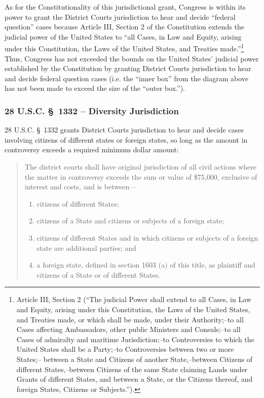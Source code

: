 As for the Constitutionality of this jurisdictional grant, Congress is within its power to grant the District Courts jurisdiction to hear and decide ``federal question'' cases because Article III, Section 2 of the Constitution extends the judicial power of the United States to ``all Cases, in Law and Equity, arising under this Constitution, the Laws of the United States, and Treaties made.''\footnote{Article III, Section 2 (``The judicial Power shall extend to all Cases, in Law and Equity, arising under this Constitution, the Laws of the United States, and Treaties made, or which shall be made, under their Authority;--to all Cases affecting Ambassadors, other public Ministers and Consuls;--to all Cases of admiralty and maritime Jurisdiction;--to Controversies to which the United States shall be a Party;--to Controversies between two or more States;-- between a State and Citizens of another State,--between Citizens of different States,--between Citizens of the same State claiming Lands under Grants of different States, and between a State, or the Citizens thereof, and foreign States, Citizens or Subjects.'').}  Thus, Congress has not exceeded the bounds on the United States' judicial power established by the Constitution by granting District Courts jurisdiction to hear and decide federal question cases (i.e. the ``inner box'' from the diagram above has not been made to exceed the size of the ``outer box.'').

\subsubsection{28 U.S.C. \S\ 1332 -- Diversity Jurisdiction} 
28 U.S.C. \S\ 1332 grants District Courts jurisdiction to hear and decide cases involving citizens of different states or foreign states, so long as the amount in controversy exceeds a required minimum dollar amount:

\begin{quote}
The district courts shall have original jurisdiction of all civil actions where the matter in controversy exceeds the sum or value of \$75,000, exclusive of interest and costs, and is between—
\begin{enumerate}
\item citizens of different States;
\item citizens of a State and citizens or subjects of a foreign state;
\item citizens of different States and in which citizens or subjects of a foreign state are additional parties; and
\item a foreign state, defined in section 1603 (a) of this title, as plaintiff and citizens of a State or of different States.
\end{enumerate}
\end{quote}


